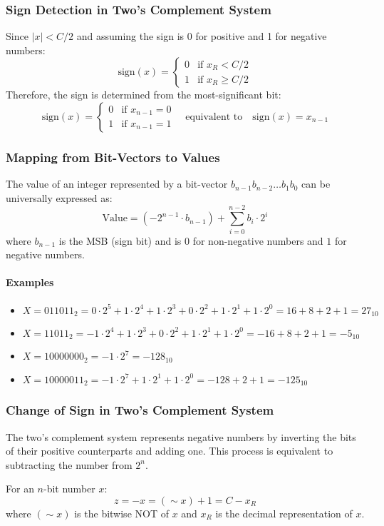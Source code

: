 \documentclass[10pt,a4paper]{book}
\begin{document}
\subsubsection{Sign Detection in Two's Complement System}
Since $|x| < C/2$ and assuming the sign is 0 for positive and 1 for negative numbers:
\[
	\text{sign}(x) = 
	\begin{cases} 
		0 & \text{if } x_R < C/2    \\
		1 & \text{if } x_R \geq C/2 
	\end{cases}
\]
Therefore, the sign is determined from the most-significant bit:
\[
	\text{sign}(x) = 
	\begin{cases} 
		0 & \text{if } x_{n-1} = 0 \\
		1 & \text{if } x_{n-1} = 1 
	\end{cases}
	\quad \text{equivalent to} \quad \text{sign}(x) = x_{n-1}
\]

\subsubsection{Mapping from Bit-Vectors to Values}
The value of an integer represented by a bit-vector $b_{n-1}b_{n-2}\ldots b_1b_0$ can be universally expressed as:
\[\text{Value} = (-2^{n-1} \cdot b_{n-1}) + \sum_{i=0}^{n-2} b_i \cdot 2^i\]
where $b_{n-1}$ is the MSB (sign bit) and is $0$ for non-negative numbers and $1$ for negative numbers.
	
\paragraph{Examples}
	\begin{itemize}
		\item[] $X = 011011_2 = 0 \cdot 2^5 + 1 \cdot 2^4 + 1 \cdot 2^3 + 0 \cdot 2^2 + 1 \cdot 2^1 + 1 \cdot 2^0 = 16 + 8 + 2 + 1 = 27_{10}$
		\item[] $X = 11011_2 = -1 \cdot 2^4 + 1 \cdot 2^3 + 0 \cdot 2^2 + 1 \cdot 2^1 + 1 \cdot 2^0 = -16 + 8 + 2 + 1 = -5_{10}$
		\item[] $X = 10000000_2 = -1 \cdot 2^7 = -128_{10}$
		\item[] $X = 10000011_2 = -1 \cdot 2^7 + 1 \cdot 2^1 + 1 \cdot 2^0 = -128 + 2 + 1 = -125_{10}$
	\end{itemize}
	  
\subsubsection{Change of Sign in Two's Complement System}
The two's complement system represents negative numbers by inverting the bits of their positive counterparts and adding one. This process is equivalent to subtracting the number from $2^n$.\par
For an $n$-bit number $x$:
\[z = -x = (\sim x) + 1 = C - x_R\]
where $(\sim x)$ is the bitwise NOT of $x$ and $x_R$ is the decimal representation of $x$.
	  
\end{document}
